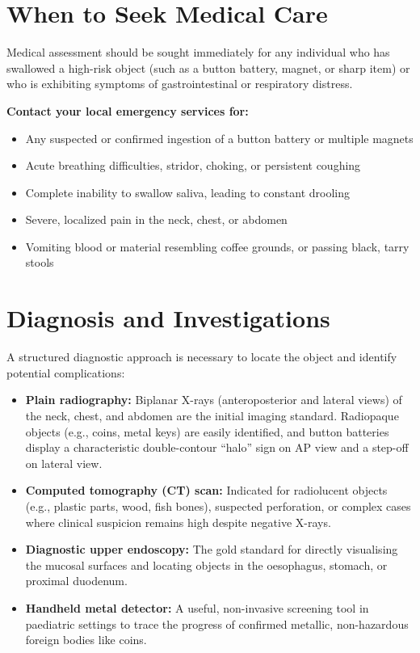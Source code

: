 \section*{When to Seek Medical Care}
Medical assessment should be sought immediately for any individual who has swallowed a high-risk object (such as a button battery, magnet, or sharp item) or who is exhibiting symptoms of gastrointestinal or respiratory distress.

\textbf{Contact your local emergency services for:}
\begin{itemize}
    \item Any suspected or confirmed ingestion of a button battery or multiple magnets
    \item Acute breathing difficulties, stridor, choking, or persistent coughing
    \item Complete inability to swallow saliva, leading to constant drooling
    \item Severe, localized pain in the neck, chest, or abdomen
    \item Vomiting blood or material resembling coffee grounds, or passing black, tarry stools
\end{itemize}

\section*{Diagnosis and Investigations}
A structured diagnostic approach is necessary to locate the object and identify potential complications:
\begin{itemize}
    \item \textbf{Plain radiography:} Biplanar X-rays (anteroposterior and lateral views) of the neck, chest, and abdomen are the initial imaging standard. Radiopaque objects (e.g., coins, metal keys) are easily identified, and button batteries display a characteristic double-contour ``halo'' sign on AP view and a step-off on lateral view.
    \item \textbf{Computed tomography (CT) scan:} Indicated for radiolucent objects (e.g., plastic parts, wood, fish bones), suspected perforation, or complex cases where clinical suspicion remains high despite negative X-rays.
    \item \textbf{Diagnostic upper endoscopy:} The gold standard for directly visualising the mucosal surfaces and locating objects in the oesophagus, stomach, or proximal duodenum.
    \item \textbf{Handheld metal detector:} A useful, non-invasive screening tool in paediatric settings to trace the progress of confirmed metallic, non-hazardous foreign bodies like coins.
\end{itemize}

